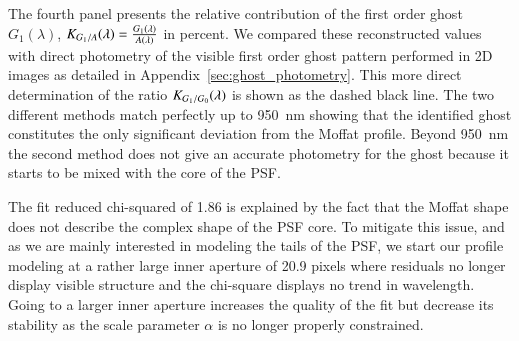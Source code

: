 The fourth panel presents the relative contribution of the first order
ghost $G_1(\lambda)$,
$K_{G_1/A}(\lambda) = \frac{G_1(\lambda)}{A(\lambda)}$ in
percent. We compared these reconstructed values with direct photometry
of the visible first order ghost pattern performed in 2D images as
detailed in Appendix~\ref{sec:ghost_photometry}. This more direct
determination of the ratio $K_{G_1/G_0}(\lambda)$ is shown as the dashed black
line. The two different methods match perfectly up to \SI{950}{nm}
showing that the identified ghost constitutes the only significant
deviation from the Moffat profile. Beyond \SI{950}{nm} the second method
does not give an accurate photometry for the ghost because it starts
to be mixed with the core of the PSF.


The fit reduced chi-squared of 1.86 is explained by the fact that the Moffat
shape does not describe the complex shape of the PSF core. To mitigate this
issue, and as we are mainly interested in modeling the tails of the PSF, we
start our profile modeling at a rather large inner aperture of 20.9 pixels where
residuals no longer display visible structure and the chi-square displays no
trend in wavelength. Going to a larger inner aperture increases the quality of
the fit but decrease its stability as the scale parameter $\alpha$ is no longer
properly constrained.

